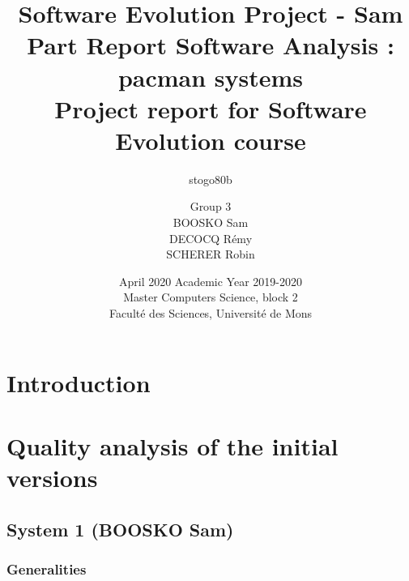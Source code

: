 \documentclass{article}
\title{Software Evolution Project - Sam Part Report}
\author{stogo80b }
\date{April 2020}
\begin{document}
\title{
\vspace{1.6cm}
{\Huge Software Analysis : pacman systems}\\
\vspace{0.5cm}
{\Huge Project report for Software Evolution course}\vspace{1cm}\\
}


\author{
\vspace{1cm}
\huge{Group 3}\\
\Large{BOOSKO Sam}\\
\Large{DECOCQ Rémy}\\
\Large{SCHERER Robin}
}


\date{
\vspace{5cm}
Academic Year 2019-2020\\
Master Computers Science, block 2\\
Faculté des Sciences, Université de Mons}

\maketitle          

\thispagestyle{empty}   

\newpage

\tableofcontents
\newpage

\section{Introduction}
\newpage
\section{Quality analysis of the initial versions}

\subsection{System 1 (BOOSKO Sam)}
\subsubsection{Generalities}
\end{document}
